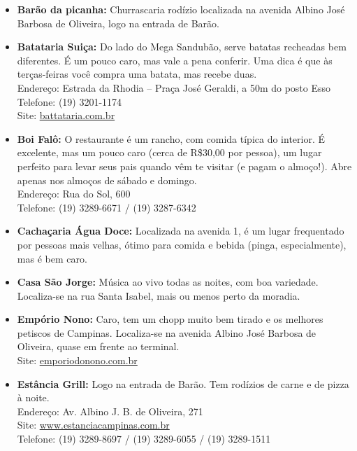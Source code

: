 \begin{itemize}
    \item   \textbf{Barão da picanha:} Churrascaria rodízio localizada na
        avenida Albino José Barbosa de Oliveira, logo na entrada de Barão.

    \item   \textbf{Batataria Suiça:} Do lado do Mega Sandubão, serve batatas
        recheadas bem diferentes. É um pouco caro, mas vale a pena conferir. Uma
        dica é que às terças-feiras você compra uma batata, mas recebe duas.
        \\Endereço: Estrada da Rhodia -- Praça José Geraldi, a 50m do posto Esso
        \\Telefone: (19) 3201-1174
        \\Site: \url{battataria.com.br}

    \item   \textbf{Boi Falô:} O restaurante é um rancho, com comida típica do
        interior. É excelente, mas um pouco caro (cerca de R\$30,00 por pessoa),
        um lugar perfeito para levar seus pais quando vêm te visitar (e pagam o
        almoço!). Abre apenas nos almoços de sábado e domingo.
        \\Endereço: Rua do Sol, 600
        \\Telefone: (19) 3289-6671 / (19) 3287-6342%

    \item   \textbf{Cachaçaria Água Doce:} Localizada na avenida 1, é um lugar
        frequentado por pessoas mais velhas, ótimo para comida e bebida (pinga,
        especialmente), mas é bem caro.

    \item   \textbf{Casa São Jorge:} Música ao vivo todas as noites, com boa
        variedade. Localiza-se na rua Santa Isabel, mais ou menos perto da
        moradia.

    \item   \textbf{Empório Nono:} Caro, tem um chopp muito bem tirado e os
        melhores petiscos de Campinas. Localiza-se na avenida Albino José
        Barbosa de Oliveira, quase em frente ao terminal.
        \\Site: \url{emporiodonono.com.br}

    \item   \textbf{Estância Grill:} Logo na entrada de Barão. Tem rodízios de
        carne e de pizza à noite.
        \\Endereço: Av. Albino J. B. de Oliveira, 271
        \\Site: \url{www.estanciacampinas.com.br}
        \\Telefone: (19) 3289-8697 / (19) 3289-6055 / (19) 3289-1511


\end{itemize}
